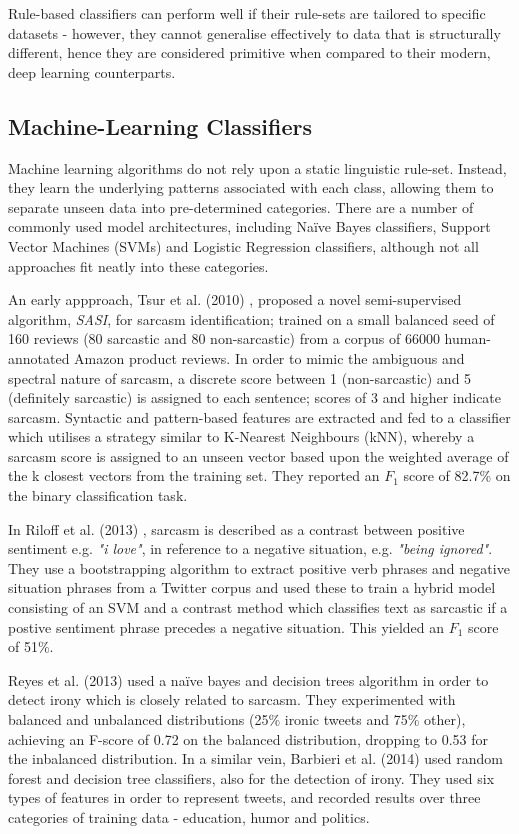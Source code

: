 \documentclass[12pt,a4paper]{article}
\begin{document}
Rule-based classifiers can perform well if their rule-sets are tailored to specific datasets - however, they cannot generalise effectively to data that is structurally different, hence they are considered  primitive when compared to their modern, deep learning counterparts.

\subsection{Machine-Learning Classifiers}\vspace{-10pt}
\noindent Machine learning algorithms do not rely upon a static linguistic rule-set. Instead, they learn the underlying patterns associated with each class, allowing them to separate unseen data into pre-determined categories. There are a number of commonly used model architectures, including Na\"{i}ve Bayes classifiers, Support Vector Machines (SVMs) and Logistic Regression classifiers, although not all approaches fit neatly into these categories.

An early appproach, Tsur et al. (2010) \cite{tsur2010icwsm}, proposed a novel semi-supervised algorithm, \textit{SASI}, for sarcasm identification; trained on a small balanced seed of 160 reviews (80 sarcastic and 80 non-sarcastic) from a corpus of 66000 human-annotated Amazon product reviews. In order to mimic the ambiguous and spectral nature of sarcasm, a discrete score between 1 (non-sarcastic) and 5 (definitely sarcastic) is assigned to each sentence; scores of 3 and higher indicate sarcasm. Syntactic and pattern-based features are extracted and fed to a classifier which utilises a strategy similar to K-Nearest Neighbours (kNN), whereby a sarcasm score is assigned to an unseen vector based upon the weighted average of the k closest vectors from the training set. They reported an $F_{1}$ score of 82.7\% on the binary classification task.

In Riloff et al. (2013) \cite{riloff2013sarcasm}, sarcasm is described as a contrast between positive sentiment e.g. \textit{"i love"}, in reference to a negative situation, e.g. \textit{"being ignored"}. They use a bootstrapping algorithm to extract positive verb phrases and negative situation phrases from a Twitter corpus and used these to train a hybrid model consisting of an SVM and a contrast method which classifies text as sarcastic if a postive sentiment phrase precedes a negative situation. This yielded an $F_1$ score of 51\%.

Reyes et al. (2013) \cite{reyes2013multidimensional} used a na\"{i}ve bayes and decision trees algorithm in order to detect irony which is closely related to sarcasm. They experimented with balanced and unbalanced distributions (25\% ironic tweets and 75\% other), achieving an F-score of 0.72 on the balanced distribution, dropping to 0.53 for the inbalanced distribution. In a similar vein, Barbieri et al. (2014) \cite{barbieri2014modelling} used random forest and decision tree classifiers, also for the detection of irony. They used six types of features in order to represent tweets, and recorded results over three categories of training data - education, humor and politics.
\end{document}
